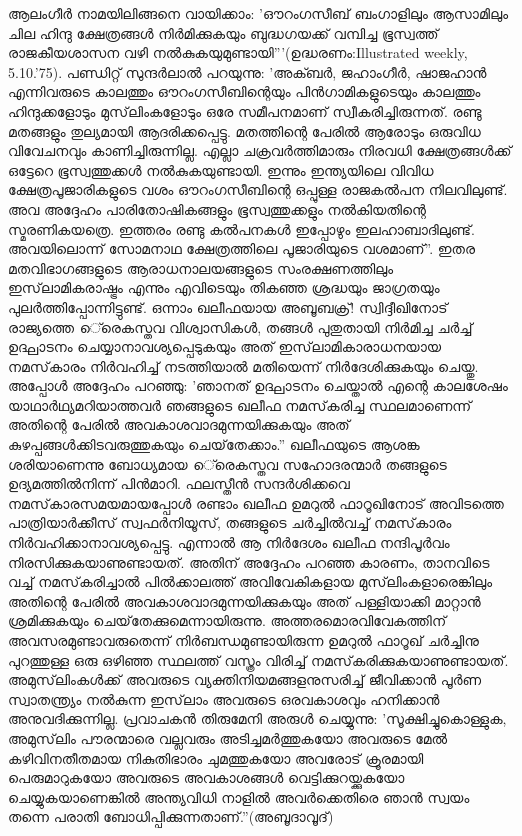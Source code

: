 ആലംഗീര്‍ നാമയിലിങ്ങനെ വായിക്കാം: 'ഔറംഗസീബ് ബംഗാളിലും ആസാമിലും ചില ഹിന്ദു ക്ഷേത്രങ്ങള്‍ നിര്‍മിക്കുകയും ബുദ്ധഗയക്ക് വമ്പിച്ച ഭൂസ്വത്ത് രാജകീയശാസന വഴി നല്‍കുകയുമുണ്ടായി'''(ഉദ്ധരണം:Illustrated weekly, 5.10.'75).
പണ്ഡിറ്റ് സുന്ദര്‍ലാല്‍ പറയുന്നു: 'അക്ബര്‍, ജഹാംഗീര്‍, ഷാജഹാന്‍ എന്നിവരുടെ കാലത്തും ഔറംഗസീബിന്റെയും പിന്‍ഗാമികളുടെയും കാലത്തും ഹിന്ദുക്കളോടും മുസ്‌ലിംകളോടും ഒരേ സമീപനമാണ് സ്വീകരിച്ചിരുന്നത്. രണ്ടു മതങ്ങളും തുല്യമായി ആദരിക്കപ്പെട്ടു. മതത്തിന്റെ പേരില്‍ ആരോടും ഒരുവിധ വിവേചനവും കാണിച്ചിരുന്നില്ല. എല്ലാ ചക്രവര്‍ത്തിമാരും നിരവധി ക്ഷേത്രങ്ങള്‍ക്ക് ഒട്ടേറെ ഭൂസ്വത്തുക്കള്‍ നല്‍കുകയുണ്ടായി. ഇന്നും ഇന്ത്യയിലെ വിവിധ ക്ഷേത്രപൂജാരികളുടെ വശം ഔറംഗസീബിന്റെ ഒപ്പുള്ള രാജകല്‍പന നിലവിലുണ്ട്. അവ അദ്ദേഹം പാരിതോഷികങ്ങളും ഭൂസ്വത്തുക്കളും നല്‍കിയതിന്റെ സ്മരണികയത്രെ. ഇത്തരം രണ്ടു കല്‍പനകള്‍ ഇപ്പോഴും ഇലഹാബാദിലുണ്ട്. അവയിലൊന്ന് സോമനാഥ ക്ഷേത്രത്തിലെ പൂജാരിയുടെ വശമാണ്''.
ഇതര മതവിഭാഗങ്ങളുടെ ആരാധനാലയങ്ങളുടെ സംരക്ഷണത്തിലും ഇസ്‌ലാമികരാഷ്ട്രം എന്നും എവിടെയും തികഞ്ഞ ശ്രദ്ധയും ജാഗ്രതയും പുലര്‍ത്തിപ്പോന്നിട്ടുണ്ട്. ഒന്നാം ഖലീഫയായ അബൂബക്ര്! സ്വിദ്ദീഖിനോട് രാജ്യത്തെ െ്രെകസ്തവ വിശ്വാസികള്‍, തങ്ങള്‍ പുതുതായി നിര്‍മിച്ച ചര്‍ച്ച് ഉദ്ഘാടനം ചെയ്യാനാവശ്യപ്പെടുകയും അത് ഇസ്‌ലാമികാരാധനയായ നമസ്‌കാരം നിര്‍വഹിച്ച് നടത്തിയാല്‍ മതിയെന്ന് നിര്‍ദേശിക്കുകയും ചെയ്തു. അപ്പോള്‍ അദ്ദേഹം പറഞ്ഞു: 'ഞാനത് ഉദ്ഘാടനം ചെയ്താല്‍ എന്റെ കാലശേഷം യാഥാര്‍ഥ്യമറിയാത്തവര്‍ ഞങ്ങളുടെ ഖലീഫ നമസ്‌കരിച്ച സ്ഥലമാണെന്ന് അതിന്റെ പേരില്‍ അവകാശവാദമുന്നയിക്കുകയും അത് കുഴപ്പങ്ങള്‍ക്കിടവരുത്തുകയും ചെയ്‌തേക്കാം.'' ഖലീഫയുടെ ആശങ്ക ശരിയാണെന്നു ബോധ്യമായ െ്രെകസ്തവ സഹോദരന്മാര്‍ തങ്ങളുടെ ഉദ്യമത്തില്‍നിന്ന് പിന്‍മാറി.
ഫലസ്തീന്‍ സന്ദര്‍ശിക്കവെ നമസ്‌കാരസമയമായപ്പോള്‍ രണ്ടാം ഖലീഫ ഉമറുല്‍ ഫാറൂഖിനോട് അവിടത്തെ പാത്രിയാര്‍ക്കീസ് സ്വഫര്‍നിയൂസ്, തങ്ങളുടെ ചര്‍ച്ചില്‍വച്ച് നമസ്‌കാരം നിര്‍വഹിക്കാനാവശ്യപ്പെട്ടു. എന്നാല്‍ ആ നിര്‍ദേശം ഖലീഫ നന്ദിപൂര്‍വം നിരസിക്കുകയാണുണ്ടായത്. അതിന് അദ്ദേഹം പറഞ്ഞ കാരണം, താനവിടെ വച്ച് നമസ്‌കരിച്ചാല്‍ പില്‍ക്കാലത്ത് അവിവേകികളായ മുസ്‌ലിംകളാരെങ്കിലും അതിന്റെ പേരില്‍ അവകാശവാദമുന്നയിക്കുകയും അത് പള്ളിയാക്കി മാറ്റാന്‍ ശ്രമിക്കുകയും ചെയ്‌തേക്കുമെന്നായിരുന്നു. അത്തരമൊരവിവേകത്തിന് അവസരമുണ്ടാവരുതെന്ന് നിര്‍ബന്ധമുണ്ടായിരുന്ന ഉമറുല്‍ ഫാറൂഖ് ചര്‍ച്ചിനു പുറത്തുള്ള ഒരു ഒഴിഞ്ഞ സ്ഥലത്ത് വസ്ത്രം വിരിച്ച് നമസ്‌കരിക്കുകയാണുണ്ടായത്.
അമുസ്‌ലിംകള്‍ക്ക് അവരുടെ വ്യക്തിനിയമങ്ങളനുസരിച്ച് ജീവിക്കാന്‍ പൂര്‍ണ സ്വാതന്ത്യ്രം നല്‍കുന്ന ഇസ്‌ലാം അവരുടെ ഒരവകാശവും ഹനിക്കാന്‍ അനുവദിക്കുന്നില്ല. പ്രവാചകന്‍ തിരുമേനി അരുള്‍ ചെയ്യുന്നു: 'സൂക്ഷിച്ചുകൊള്ളുക, അമുസ്‌ലിം പൗരന്മാരെ വല്ലവരും അടിച്ചമര്‍ത്തുകയോ അവരുടെ മേല്‍ കഴിവിനതീതമായ നികുതിഭാരം ചുമത്തുകയോ അവരോട് ക്രൂരമായി പെരുമാറുകയോ അവരുടെ അവകാശങ്ങള്‍ വെട്ടിക്കുറയ്ക്കുകയോ ചെയ്യുകയാണെങ്കില്‍ അന്ത്യവിധി നാളില്‍ അവര്‍ക്കെതിരെ ഞാന്‍ സ്വയം തന്നെ പരാതി ബോധിപ്പിക്കുന്നതാണ്.''(അബൂദാവൂദ്)
